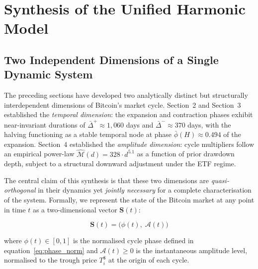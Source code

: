%


\section{Synthesis of the Unified Harmonic Model}

\subsection{Two Independent Dimensions of a Single Dynamic System}

The preceding sections have developed two analytically distinct but
structurally interdependent dimensions of Bitcoin's market cycle. Section~2
and Section~3 established the \textit{temporal dimension}: the expansion and
contraction phases exhibit near-invariant durations of $\bar{\Delta}^{+}
\approx 1{,}060$ days and $\bar{\Delta}^{-} \approx 370$ days, with the
halving functioning as a stable temporal node at phase $\bar{\phi}(H) \approx
0.494$ of the expansion. Section~4 established the \textit{amplitude
dimension}: cycle multipliers follow an empirical power-law
$\hat{\mathcal{M}}(d) = 328 \cdot d^{5.1}$ as a function of prior drawdown
depth, subject to a structural downward adjustment under the ETF regime.

The central claim of this synthesis is that these two dimensions are
\textit{quasi-orthogonal} in their dynamics yet \textit{jointly necessary} for
a complete characterisation of the system. Formally, we represent the state of
the Bitcoin market at any point in time $t$ as a two-dimensional vector
$\mathbf{S}(t)$:

\begin{equation}
  \mathbf{S}(t) = \bigl(\phi(t),\; \mathcal{A}(t)\bigr)
  \label{eq:state_vector}
\end{equation}

where $\phi(t) \in [0, 1]$ is the normalised cycle phase defined in
equation~\eqref{eq:phase_norm} and $\mathcal{A}(t) \geq 0$ is the
instantaneous amplitude level, normalised to the trough price
$T^{\$}_i$ at the origin of each cycle.

